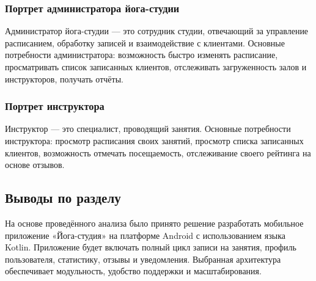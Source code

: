 \subsubsection{Портрет администратора йога-студии}

Администратор йога-студии — это сотрудник студии, отвечающий за управление расписанием, обработку записей и взаимодействие с клиентами. Основные потребности администратора: возможность быстро изменять расписание, просматривать список записанных клиентов, отслеживать загруженность залов и инструкторов, получать отчёты.

\subsubsection{Портрет инструктора}

Инструктор — это специалист, проводящий занятия. Основные потребности инструктора: просмотр расписания своих занятий, просмотр списка записанных клиентов, возможность отмечать посещаемость, отслеживание своего рейтинга на основе отзывов.

\subsection{Выводы по разделу}

На основе проведённого анализа было принято решение разработать мобильное приложение «Йога-студия» на платформе Android с использованием языка Kotlin. Приложение будет включать полный цикл записи на занятия, профиль пользователя, статистику, отзывы и уведомления. Выбранная архитектура обеспечивает модульность, удобство поддержки и масштабирования.